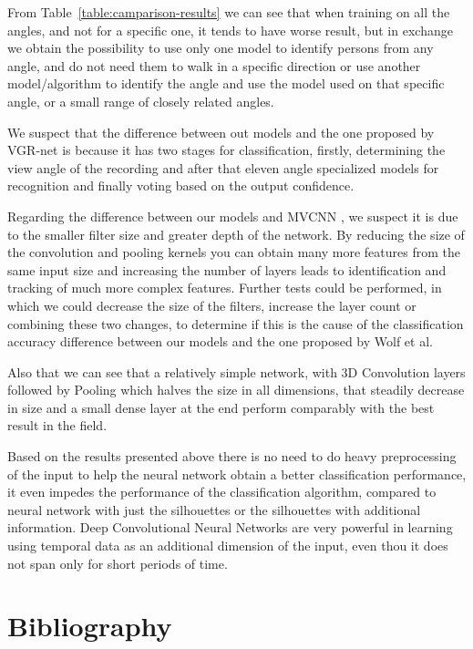 \documentclass[12pt]{article}
\theoremstyle{definition}
\begin{document}
	From Table~\ref{table:camparison-results} we can see that when training on all the angles, and not for a specific one, it tends to have worse result, but in exchange we obtain the possibility to use only one model to identify persons from any angle, and do not need them to walk in a specific direction or use another model/algorithm to identify the angle and use the model used on that specific angle, or a small range of closely related angles.

	We suspect that the difference between out models and the one proposed by VGR-net \cite{VGR-Net} is because it has two stages for classification, firstly, determining the view angle of the recording and after that eleven angle specialized models for recognition and finally voting based on the output confidence.

	Regarding the difference between our models and MVCNN \cite{Wolf2016MultiviewGR}, we suspect it is due to the smaller filter size and greater depth of the network. By reducing the size of the convolution and pooling kernels you can obtain many more features from the same input size and increasing the number of layers leads to identification and tracking of much more complex features. Further tests could be performed, in which we could decrease the size of the filters, increase the layer count or combining these two changes, to determine if this is the cause of the classification accuracy difference between our models and the one proposed by Wolf et al\cite{Wolf2016MultiviewGR}.

	Also that we can see that a relatively simple network, with 3D Convolution layers followed by Pooling which halves the size in all dimensions, that steadily decrease in size and a small dense layer at the end perform comparably with the best result in the field.

	Based on the results presented above there is no need to do heavy preprocessing of the input to help the neural network obtain a better classification performance, it even impedes the performance of the classification algorithm, compared to neural network with just the silhouettes or the silhouettes with additional information. Deep Convolutional Neural Networks are very powerful in learning using temporal data as an additional dimension of the input, even thou it does not span only for short periods of time.

	\clearpage

	\section{Bibliography}
	
	
\end{document}

